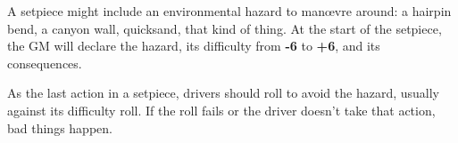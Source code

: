 
A setpiece might include an environmental hazard to man\oe{}vre around: a hairpin bend, a canyon wall, quicksand, that kind of thing. At the start of the setpiece, the GM will declare the hazard, its difficulty from \textbf{-6} to \textbf{+6}, and its consequences.

As the last action in a setpiece, drivers should roll to avoid the hazard, usually  against its difficulty roll. If the roll fails or the driver doesn't take that action, bad things happen.
